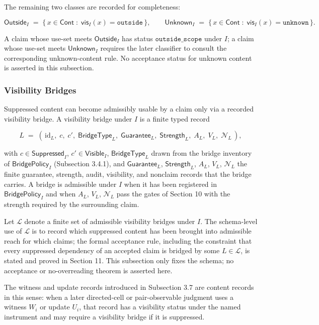 \documentclass[11pt]{article}
\theoremstyle{definition}
\begin{document}
The remaining two classes are recorded for completeness:

\[
\mathsf{Outside}_I\;=\;\{\,x\in\mathsf{Cont}\;:\;\mathsf{vis}_I(x)=\texttt{outside}\,\},\qquad \mathsf{Unknown}_I\;=\;\{\,x\in\mathsf{Cont}\;:\;\mathsf{vis}_I(x)=\texttt{unknown}\,\}.
\]

A claim whose use-set meets \(\mathsf{Outside}_I\) has status \(\texttt{outside\_scope}\) under \(I\); a claim whose use-set meets \(\mathsf{Unknown}_I\) requires the later classifier to consult the corresponding unknown-content rule. No acceptance status for unknown content is asserted in this subsection.

\subsubsection{Visibility Bridges}

Suppressed content can become admissibly usable by a claim only via a recorded visibility bridge. A visibility bridge under \(I\) is a finite typed record

\[
L\;=\;(\,\mathrm{id}_L,\;c,\;c',\;\mathsf{BridgeType}_L,\;\mathsf{Guarantee}_L,\;\mathsf{Strength}_L,\;A_L,\;V_L,\;\mathcal N_L\,),
\]

with \(c\in\mathsf{Suppressed}_I\), \(c'\in\mathsf{Visible}_I\), \(\mathsf{BridgeType}_L\) drawn from the bridge inventory of \(\mathsf{BridgePolicy}_I\) (Subsection 3.4.1), and \(\mathsf{Guarantee}_L\), \(\mathsf{Strength}_L\), \(A_L\), \(V_L\), \(\mathcal N_L\) the finite guarantee, strength, audit, visibility, and nonclaim records that the bridge carries. A bridge is admissible under \(I\) when it has been registered in \(\mathsf{BridgePolicy}_I\) and when \(A_L\), \(V_L\), \(\mathcal N_L\) pass the gates of Section 10 with the strength required by the surrounding claim.

Let \(\mathcal L\) denote a finite set of admissible visibility bridges under \(I\). The schema-level use of \(\mathcal L\) is to record which suppressed content has been brought into admissible reach for which claims; the formal acceptance rule, including the constraint that every suppressed dependency of an accepted claim is bridged by some \(L\in\mathcal L\), is stated and proved in Section 11. This subsection only fixes the schema; no acceptance or no-overreading theorem is asserted here.

The witness and update records introduced in Subsection 3.7 are content records in this sense: when a later directed-cell or pair-observable judgment uses a witness \(W_i\) or update \(U_i\), that record has a visibility status under the named instrument and may require a visibility bridge if it is suppressed.
\end{document}
